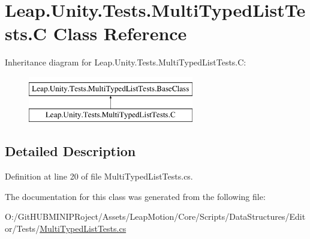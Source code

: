 \hypertarget{class_leap_1_1_unity_1_1_tests_1_1_multi_typed_list_tests_1_1_c}{}\section{Leap.\+Unity.\+Tests.\+Multi\+Typed\+List\+Tests.\+C Class Reference}
\label{class_leap_1_1_unity_1_1_tests_1_1_multi_typed_list_tests_1_1_c}
Inheritance diagram for Leap.\+Unity.\+Tests.\+Multi\+Typed\+List\+Tests.\+C\+:\begin{figure}[H]
\begin{center}
\leavevmode
\includegraphics[height=2.000000cm]{class_leap_1_1_unity_1_1_tests_1_1_multi_typed_list_tests_1_1_c}
\end{center}
\end{figure}


\subsection{Detailed Description}


Definition at line 20 of file Multi\+Typed\+List\+Tests.\+cs.



The documentation for this class was generated from the following file\+:\begin{DoxyCompactItemize}
\item 
O\+:/\+Git\+H\+U\+B\+M\+I\+N\+I\+P\+Roject/\+Assets/\+Leap\+Motion/\+Core/\+Scripts/\+Data\+Structures/\+Editor/\+Tests/\mbox{\hyperlink{_multi_typed_list_tests_8cs}{Multi\+Typed\+List\+Tests.\+cs}}\end{DoxyCompactItemize}
